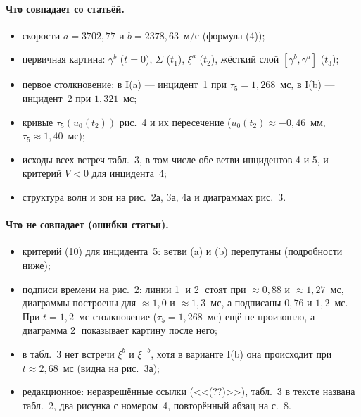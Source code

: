 \documentclass[11pt,a4paper]{article}
\theoremstyle{definition}
\theoremstyle{remark}
\begin{document}
\paragraph{Что совпадает со статьёй.}
\begin{itemize}
\item скорости $a=3702{,}77$ и $b=2378{,}63$~м/с (формула (4));
\item первичная картина: $\gamma^b$ ($t=0$), $\Sigma$ ($t_1$), $\xi^a$ ($t_2$), жёсткий слой $[\gamma^b,\gamma^a]$ ($t_3$);
\item первое столкновение: в I(a) --- инцидент~1 при $\tau_5=1{,}268$~мс, в I(b) --- инцидент~2 при $1{,}321$~мс;
\item кривые $\tau_5(u_0(t_2))$ рис.~4 и их пересечение ($u_0(t_2)\approx-0{,}46$~мм, $\tau_5\approx1{,}40$~мс);
\item исходы всех встреч табл.~3, в том числе обе ветви инцидентов 4 и 5, и критерий $V<0$ для инцидента~4;
\item структура волн и зон на рис.~2а, 3а, 4а и диаграммах рис.~3.
\end{itemize}

\paragraph{Что не совпадает (ошибки статьи).}
\begin{itemize}
\item критерий (10) для инцидента~5: ветви (a) и (b) перепутаны (подробности ниже);
\item подписи времени на рис.~2: линии \textcircled{\scriptsize1} и \textcircled{\scriptsize2} стоят при
$\approx0{,}88$ и $\approx1{,}27$~мс, диаграммы построены для $\approx1{,}0$ и $\approx1{,}3$~мс, а подписаны
$0{,}76$ и $1{,}2$~мс. При $t=1{,}2$~мс столкновение ($\tau_5=1{,}268$~мс) ещё не произошло, а
диаграмма \textcircled{\scriptsize2} показывает картину после него;
\item в табл.~3 нет встречи $\xi^b$ и $\xi^{-b}$, хотя в варианте I(b) она происходит при $t\approx2{,}68$~мс
(видна на рис.~3а);
\item редакционное: неразрешённые ссылки (<<(??)>>), табл.~3 в тексте названа табл.~2, два рисунка
с номером~4, повторённый абзац на с.~8.
\end{itemize}
\end{document}
